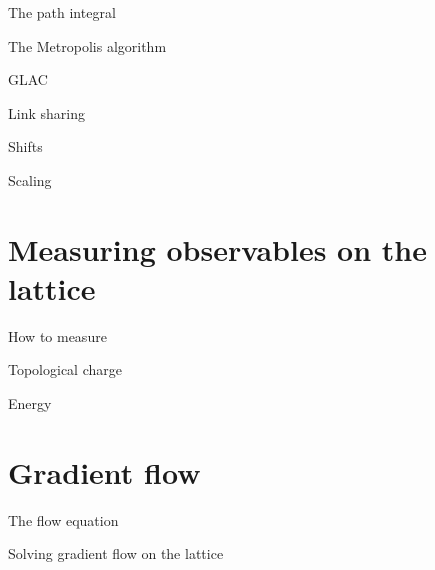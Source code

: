\documentclass[10pt,show notes on second screen]{beamer}
\begin{document}
\begin{frame}{The path integral}
\end{frame}

\begin{frame}{The Metropolis algorithm}
\end{frame}

\begin{frame}{GLAC}
\end{frame}

\begin{frame}{Link sharing}
\end{frame}

\begin{frame}{Shifts}
\end{frame}

\begin{frame}{Scaling}
\end{frame}

\section{Measuring observables on the lattice}
\begin{frame}{How to measure}
\end{frame}

\begin{frame}{Topological charge}
\end{frame}

\begin{frame}{Energy}
\end{frame}

\section{Gradient flow}

\begin{frame}{The flow equation}
\end{frame}

\begin{frame}{Solving gradient flow on the lattice}
\end{frame}
\end{document}
